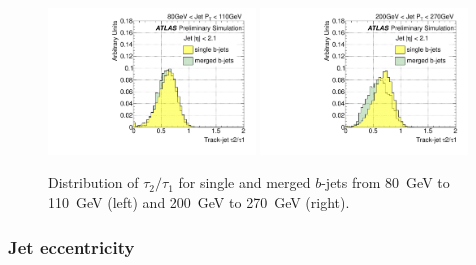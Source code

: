\begin{figure}[tp]
\centering
\includegraphics[width=0.49\textwidth]{FIGS/VarsSingleMerged/TauRatio080.pdf}
\includegraphics[width=0.49\textwidth]{FIGS/VarsSingleMerged/TauRatio200.pdf}
\caption{Distribution of $\tau_2/\tau_1$ for single and merged $b$-jets from 80~GeV to 110~GeV (left) and 200~GeV to 270~GeV (right).}
\label{fig:tauratiosinglemerged}
\end{figure}



 
\subsubsection{Jet eccentricity} 

